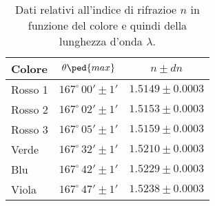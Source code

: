 \begin{table}[H]
    \centering
    \small
    \begin{tabular}{l c c}
        \toprule
        Colore & $\theta\ped{max}$ & $n \pm dn$ \\
        \midrule
		Rosso 1	& 	$167^\circ \, 00' \pm 1'$ &	$1.5149 \pm 0.0003$ \\	
		Rosso 2	& 	$167^\circ \, 02' \pm 1'$ &	$1.5153 \pm 0.0003$ \\
		Rosso 3	& 	$167^\circ \, 05' \pm 1'$ &	$1.5159 \pm 0.0003$ \\
		Verde &		$167^\circ \, 32' \pm 1'$ &	$1.5210 \pm 0.0003$ \\
		Blu &		$167^\circ \, 42' \pm 1'$ &	$1.5229 \pm 0.0003$ \\
		Viola &		$167^\circ \, 47' \pm 1'$ &	$1.5238 \pm 0.0003$ \\
        \bottomrule
    \end{tabular}
    \caption{Dati relativi all'indice di rifrazioe $n$ in funzione del colore e quindi della lunghezza d'onda $\lambda$.}
    \label{tab:enne}
\end{table}
